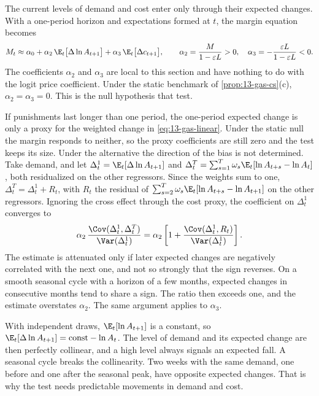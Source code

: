 The current levels of demand and cost enter only through their expected changes. With a one-period horizon
and expectations formed at $t$, the margin equation becomes
\begin{equation}\label{eq:13-gas-reg}
M_t\approx\alpha_0+\alpha_2\,\E_t\big[\Delta\ln A_{t+1}\big]+\alpha_3\,\E_t\big[\Delta c_{t+1}\big],\qquad
\alpha_2=\frac{M}{1-\varepsilon L}>0,\quad \alpha_3=-\frac{\varepsilon L}{1-\varepsilon L}<0 .
\end{equation}
The coefficients $\alpha_2$ and $\alpha_3$ are local to this section and have nothing to do with the logit
price coefficient. Under the static benchmark of \cref{prop:13-gas-cs}(c), $\alpha_2=\alpha_3=0$. This is
the null hypothesis that \citet{BorensteinShepard1996} test.

If punishments last longer than one period, the one-period expected change is only a proxy for the weighted
change in \eqref{eq:13-gas-linear}. Under the static null the margin responds to neither, so the proxy
coefficients are still zero and the test keeps its size. Under the alternative the direction of the bias is not
determined. Take demand, and let $\Delta^{1}_t = \E_t[\Delta\ln A_{t+1}]$ and
$\Delta^{T}_t = \sum_{s=1}^{T}\omega_s\E_t[\ln A_{t+s} - \ln A_t]$, both residualized on the other regressors.
Since the weights sum to one, $\Delta^{T}_t = \Delta^{1}_t + R_t$, with $R_t$ the residual of
$\sum_{s=2}^{T}\omega_s\E_t[\ln A_{t+s} - \ln A_{t+1}]$ on the other regressors. Ignoring the cross effect through the cost proxy, the
coefficient on $\Delta^{1}_t$ converges to
\begin{equation*}
\alpha_2\,\frac{\Cov(\Delta^{1}_t, \Delta^{T}_t)}{\Var(\Delta^{1}_t)}
= \alpha_2\left[1 + \frac{\Cov(\Delta^{1}_t, R_t)}{\Var(\Delta^{1}_t)}\right] .
\end{equation*}
The estimate is attenuated only if later expected changes are negatively correlated with the next one, and not so
strongly that the sign reverses. On a smooth seasonal cycle with a horizon of a few months, expected changes in
consecutive months tend to share a sign. The ratio then exceeds one, and the estimate overstates $\alpha_2$. The
same argument applies to $\alpha_3$.

\begin{remark}\label{rem:13-gas-level-change}
With independent draws, $\E_t[\ln A_{t+1}]$ is a constant, so $\E_t[\Delta\ln A_{t+1}]=\text{const}-\ln A_t$.
The level of demand and its expected change are then perfectly collinear, and a high level always signals
an expected fall. A seasonal cycle breaks the collinearity. Two weeks with the same demand, one before and
one after the seasonal peak, have opposite expected changes. That is why the test needs predictable
movements in demand and cost.
\end{remark}

